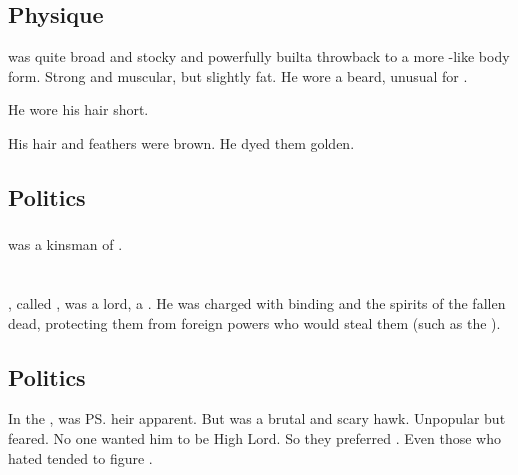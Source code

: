 \subsection{Physique}
\Ganethed{} was quite broad and stocky and powerfully built\dash a throwback to a more \nephil-like body form. 
Strong and muscular, but slightly fat. 
He wore a beard, unusual for \resphain. 

He wore his hair short. 

His hair and feathers were brown. 
He dyed them golden.









\subsection{Politics}





\subsubsection{\Urizeth}
\Ganethed was a kinsman of .















\section{\Harbeth}
\index{\Harbeth}
\Harbeth, called , was a \resphan{} lord, a \sathariah. 
He was charged with binding and  the spirits of the fallen dead, protecting them from foreign powers who would steal them (such as the ). 










\subsection{Politics}
In the , \Harbeth{} was \ps{\Azraid} heir apparent. 
But \Harbeth{} was a brutal and scary hawk. 
Unpopular but feared. 
No one wanted him to be High Lord. 
So they preferred \Azraid. 
Even those who hated \Azraid{} tended to figure . 

